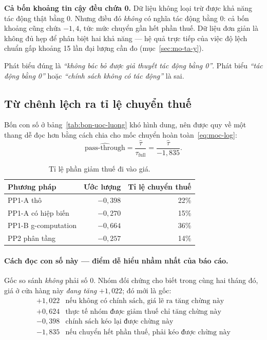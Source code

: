 \documentclass[11pt]{article}
\begin{document}
\textbf{Cả bốn khoảng tin cậy đều chứa 0.} Dữ liệu không loại trừ được khả năng tác động thật bằng
0. Nhưng điều đó \emph{không} có nghĩa tác động bằng 0: cả bốn khoảng cũng chứa $-1{,}4$, tức mức
chuyển gần hết phần thuế. Dữ liệu đơn giản là không đủ hẹp để phân biệt hai khả năng --- hệ quả
trực tiếp của việc độ lệch chuẩn gấp khoảng 15 lần đại lượng cần đo (mục~\ref{sec:mo-ta-y}).

Phát biểu đúng là \emph{``không bác bỏ được giả thuyết tác động bằng 0''}. Phát biểu
\emph{``tác động bằng 0''} hoặc \emph{``chính sách không có tác động''} là sai.

\subsection{Từ chênh lệch ra tỉ lệ chuyển thuế}
\label{sec:pass-through}

Bốn con số ở bảng~\ref{tab:bon-uoc-luong} khó hình dung, nên được quy về một thang dễ đọc hơn bằng
cách chia cho mốc chuyển hoàn toàn~\eqref{eq:moc-log}:
\begin{equation}
  \widehat{\text{pass-through}} = \frac{\hat\tau}{\tau_{\text{full}}}
  = \frac{\hat\tau}{-1{,}835}.
  \label{eq:pass-through}
\end{equation}

\begin{table}[htbp]
  \centering
  \caption{Tỉ lệ phần giảm thuế đi vào giá.}
  \label{tab:pass-through}
  \begin{tabular}{lrr}
    \toprule
    Phương pháp & Ước lượng & Tỉ lệ chuyển thuế \\
    \midrule
    PP1-A thô           & $-0{,}398$ & 22\% \\
    PP1-A có hiệp biến  & $-0{,}270$ & 15\% \\
    PP1-B g-computation & $-0{,}664$ & 36\% \\
    PP2 phân tầng       & $-0{,}257$ & 14\% \\
    \bottomrule
  \end{tabular}
\end{table}

\paragraph{Cách đọc con số này --- điểm dễ hiểu nhầm nhất của báo cáo.} Gốc so sánh
\emph{không} phải số 0. Nhóm đối chứng cho biết trong cùng hai tháng đó, giá ở cửa hàng này
\emph{đang tăng} $+1{,}022$; đó mới là gốc:
\[
  \begin{array}{rl}
    +1{,}022 & \text{nếu không có chính sách, giá lẽ ra tăng chừng này} \\
    +0{,}624 & \text{thực tế nhóm được giảm thuế chỉ tăng chừng này} \\ \hline
    -0{,}398 & \text{chính sách kéo lại được chừng này} \\[0.3em]
    -1{,}835 & \text{nếu chuyển hết phần thuế, phải kéo được chừng này}
  \end{array}
\]
\end{document}
